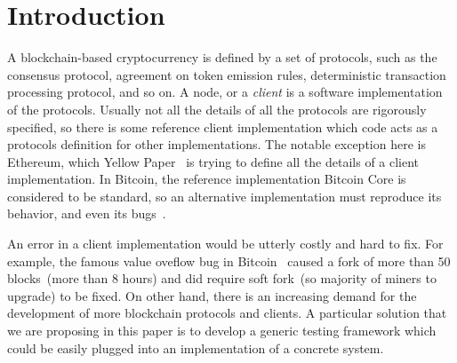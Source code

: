 
\section{Introduction}

A blockchain-based cryptocurrency is defined by a set of protocols, such as the consensus protocol, agreement on token emission rules, deterministic transaction processing protocol, and so on. A node, or a {\em client} is a software implementation of the protocols. Usually not all the details of all the protocols are rigorously specified, so there is some reference client implementation which code acts as a protocols definition for other implementations. The notable exception here is Ethereum, which Yellow Paper~\cite{ethyp} is trying to define all the details of a client implementation. In Bitcoin, the reference implementation Bitcoin Core is considered to be standard, so an alternative implementation must reproduce its behavior, and even its bugs~\cite{bitbugs}. 

An error in a client implementation would be utterly costly and hard to fix. For example, the famous value oveflow bug in Bitcoin~\cite{overflow} caused a fork of more than 50 blocks~(more than 8 hours) and did require soft fork~(so majority of miners to upgrade) to be fixed. On other hand, there is an increasing demand for the development of more blockchain protocols and clients. A particular solution that we are proposing in this paper is to develop a generic testing framework which could be easily plugged into an implementation of a concrete system.  
